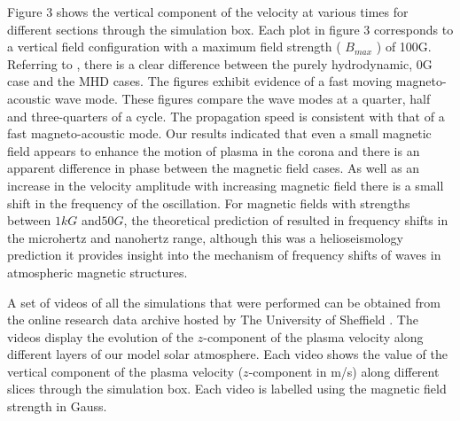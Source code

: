 \documentclass[linenumbers]{aastex63}
\begin{document}
 Figure 3 shows the vertical component of the velocity at various times for different sections through the simulation box. Each plot in  figure 3 corresponds to a vertical field configuration with a maximum field strength ( $ B_{max} $ ) of 100G. Referring to \citet{Griffiths2018b}, there is a clear difference between the purely hydrodynamic, 0G case and the MHD cases. The figures exhibit evidence of a fast moving magneto-acoustic wave mode. These figures compare the wave modes at a quarter, half and three-quarters of a cycle. The propagation speed is consistent with that of a fast magneto-acoustic mode. Our results indicated that even a small magnetic field appears to enhance the motion of plasma in the corona and  there is an apparent difference in phase between the magnetic field cases. As well as an increase in the velocity amplitude with increasing magnetic field there is a small shift in the frequency of the oscillation. For magnetic fields with strengths between $1kG$ and$50G$, the theoretical prediction of \citet{Hindman1996} resulted in frequency shifts in the microhertz and nanohertz range,  although this was a helioseismology prediction it provides insight into the mechanism of frequency shifts of waves in atmospheric magnetic structures. 

A set of videos of all the simulations that were performed can be obtained from the online research data archive hosted by The University of Sheffield \citet{Griffiths2018a}. The videos display the evolution of the $z$-component of the plasma velocity along different layers of our model solar atmosphere. Each video shows the value of the vertical component of the plasma velocity ($z$-component in m/s) along different slices through the simulation box. Each video is labelled using the magnetic field strength in Gauss.







\end{document}

